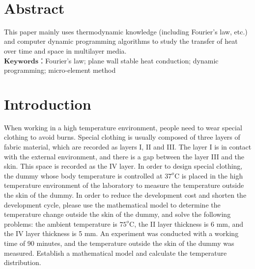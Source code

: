 \documentclass[12pt]{ctexart}
\makeatletter
\let\thedate\@date
\makeatother
\begin{document}
\begin{titlepage}
	{\large \thedate}\\[2 cm]
 
	\vfill
	
\end{titlepage}


\tableofcontents
\pagebreak


\section{Abstract}
This paper mainly uses thermodynamic knowledge (including Fourier's law, etc.) and computer dynamic programming algorithms to study the transfer of heat over time and space in multilayer media.\\
\indent $\textbf{Keywords}$：Fourier's law; plane wall stable heat conduction; dynamic programming; micro-element method
\section{Introduction}
\indent 
When working in a high temperature environment, people need to wear special clothing to avoid burns. Special clothing is usually composed of three layers of fabric material, which are recorded as layers I, II and III. The layer I is in contact with the external environment, and there is a gap between the layer III and the skin. This space is recorded as the IV layer. In order to design special clothing, the dummy whose body temperature is controlled at $37^{o}$C is placed in the high temperature environment of the laboratory to measure the temperature outside the skin of the dummy. In order to reduce the development cost and shorten the development cycle, please use the mathematical model to determine the temperature change outside the skin of the dummy,
and solve the following problems: the ambient temperature is $75^{o}$C, the II layer thickness is 6 mm, and the IV layer thickness is 5 mm. An experiment was conducted with a working time of 90 minutes, and the temperature outside the skin of the dummy was measured. Establish a mathematical model and calculate the temperature distribution.
\end{document}
